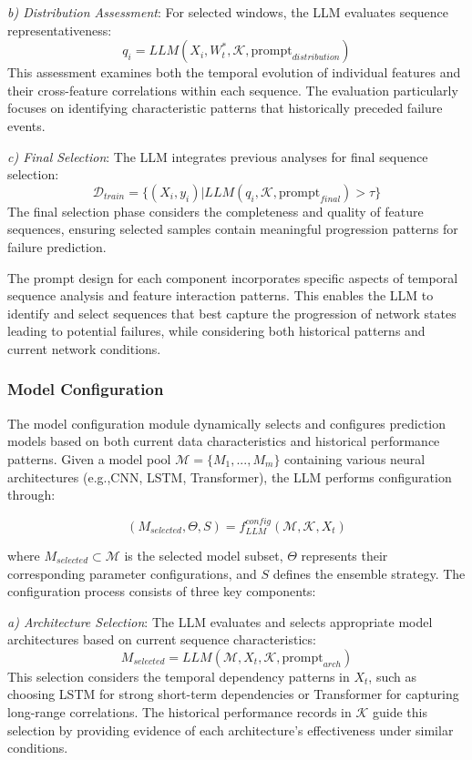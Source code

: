 \documentclass[conference]{IEEEtran}
\begin{document}
\textit{b) Distribution Assessment}: For selected windows, the LLM evaluates sequence representativeness:
\begin{equation}
    q_i = LLM(X_i, W_t^*, \mathcal{K}, \text{prompt}_{distribution})
\end{equation}
This assessment examines both the temporal evolution of individual features and their cross-feature correlations within each sequence. The evaluation particularly focuses on identifying characteristic patterns that historically preceded failure events.

\textit{c) Final Selection}: The LLM integrates previous analyses for final sequence selection:
\begin{equation}
    \mathcal{D}_{train} = \{(X_i, y_i) | LLM(q_i, \mathcal{K}, \text{prompt}_{final}) > \tau\}
\end{equation}
The final selection phase considers the completeness and quality of feature sequences, ensuring selected samples contain meaningful progression patterns for failure prediction.

The prompt design for each component incorporates specific aspects of temporal sequence analysis and feature interaction patterns. This enables the LLM to identify and select sequences that best capture the progression of network states leading to potential failures, while considering both historical patterns and current network conditions.

\subsubsection{Model Configuration}
The model configuration module dynamically selects and configures prediction models based on both current data characteristics and historical performance patterns. Given a model pool $\mathcal{M} = \{M_1, ..., M_m\}$ containing various neural architectures (e.g.,CNN, LSTM, Transformer), the LLM performs configuration through:

\begin{equation}
    (M_{selected}, \Theta, S) = f_{LLM}^{config}(\mathcal{M}, \mathcal{K}, X_t)
\end{equation}

where $M_{selected} \subset \mathcal{M}$ is the selected model subset, $\Theta$ represents their corresponding parameter configurations, and $S$ defines the ensemble strategy. The configuration process consists of three key components:

\textit{a) Architecture Selection}: The LLM evaluates and selects appropriate model architectures based on current sequence characteristics:
\begin{equation}
    M_{selected} = LLM(\mathcal{M}, X_t, \mathcal{K}, \text{prompt}_{arch})
\end{equation}
This selection considers the temporal dependency patterns in $X_t$, such as choosing LSTM for strong short-term dependencies or Transformer for capturing long-range correlations. The historical performance records in $\mathcal{K}$ guide this selection by providing evidence of each architecture's effectiveness under similar conditions.
\end{document}
